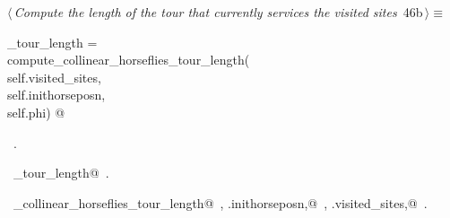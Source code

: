 \documentclass[11.5pt]{report}
\begin{document}
\vspace{-0.8cm}\newchunk 

\begin{flushleft} \small\label{scrap70}\raggedright\small
{} $\langle\,${\itshape Compute the length of the tour that currently services the visited sites}\nobreak\ {\footnotesize {46b}}$\,\rangle\equiv$
\vspace{-1ex}
\begin{list}{}{} \item
\mbox{}\verb@current_tour_length    = \@\\
\mbox{}\verb@         compute_collinear_horseflies_tour_length(\@\\
\mbox{}\verb@                    self.visited_sites,\@\\
\mbox{}\verb@                    self.inithorseposn,\@\\
\mbox{}\verb@                    self.phi) @\\
\mbox{}\verb@@{\NWsep}
\end{list}
\vspace{-1.5ex}
\footnotesize
\begin{list}{}{\setlength{\itemsep}{-\parsep}\setlength{\itemindent}{-\leftmargin}}
\item \NWtxtMacroRefIn\ .
\item \NWtxtIdentsDefed\nobreak\  \verb@current_tour_length@\nobreak\ .\item \NWtxtIdentsUsed\nobreak\  \verb@compute_collinear_horseflies_tour_length@\nobreak\ , \verb@self.inithorseposn,@\nobreak\ , \verb@self.visited_sites,@\nobreak\ .
\item{}
\end{list}
\vspace{4ex}
\end{flushleft}

\vspace{-0.8cm}\newchunk 
\end{document}
